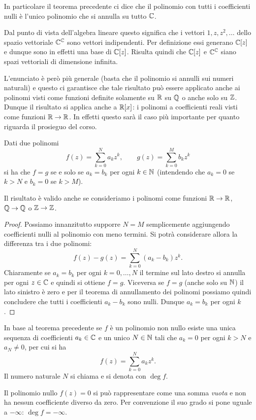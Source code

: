 In particolare il teorema precedente ci dice che il polinomio con tutti i coefficienti nulli è l'unico polinomio che si annulla su tutto $\mathbb C$.

Dal punto di vista dell'algebra lineare questo significa
che i vettori $1,z,z^2, \dots$ dello spazio vettoriale $\mathbb C^\mathbb C$ sono vettori indipendenti. Per definizione essi generano $\mathbb C[z]$ e dunque sono in effetti una base di $\mathbb C[z]$.
Risulta quindi che $\mathbb C[z]$ e $\mathbb C^\mathbb C$ siano spazi vettoriali di dimensione infinita.

L'enunciato è però più generale (basta che il polinomio si annulli sui numeri naturali) e questo ci garantisce che tale risultato può essere applicato anche ai polinomi visti come funzioni definite solamente su $\mathbb R$ su $\mathbb Q$ o anche solo su $\mathbb Z$. Dunque il risultato si applica anche a $\mathbb R[x]$: i polinomi a coefficienti reali visti come funzioni $\mathbb R \to \mathbb R$. In effetti questo sarà il caso più importante per quanto riguarda il prosieguo del corso.

\begin{theorem}
\label{th:identita_polinomi}
Dati due polinomi
\[
  f(z) = \sum_{k=0}^N a_k z^k, \qquad
  g(z) = \sum_{k=0}^M b_k z^k
\]
si ha che $f=g$
se e solo se $a_k=b_k$ per ogni $k\in \mathbb N$ (intendendo che $a_k=0$ se $k>N$ e $b_k = 0$ se $k>M$).

Il risultato è valido anche se consideriamo i polinomi come funzioni $\mathbb R\to \mathbb R$, $\mathbb Q \to \mathbb Q$ o $\mathbb Z \to \mathbb Z$.
\end{theorem}
%
\begin{proof}
Possiamo innanzitutto supporre $N=M$ semplicemente aggiungendo coefficienti nulli al polinomio con meno termini. Si potrà considerare  allora la differenza tra i due polinomi:
\[
  f(z)-g(z) = \sum_{k=0}^N (a_k - b_k)z^k.
\]
Chiaramente se $a_k=b_k$ per ogni $k=0,\dots,N$ il termine sul lato destro si annulla per ogni $z\in \mathbb C$ e quindi si ottiene $f=g$. Viceversa se $f=g$ (anche solo su $\mathbb N$)
il lato sinistro è zero e per il teorema di annullamento dei polinomi possiamo quindi concludere che tutti i coefficienti $a_k-b_k$ sono nulli. Dunque $a_k = b_k$ per ogni $k$.
\end{proof}

\begin{definition}[grado]
In
base al teorema precedente se $f$ è un polinomio non nullo esiste una unica sequenza di coefficienti $a_k\in \mathbb C$ e un unico $N\in \mathbb N$ tali che $a_k=0$ per ogni $k>N$ e $a_N\neq 0$, per cui si ha
\[
  f(z) = \sum_{k=0}^N a_k z^k.
\]
Il numero naturale $N$ si chiama 
e si denota con $\deg f$.

Il polinomio nullo $f(z)=0$ si può rappresentare come una somma \emph{vuota} e non ha nessun coefficiente diverso da zero.
Per convenzione il suo grado si pone uguale a $-\infty$:
$\deg f = -\infty$.
\end{definition}

